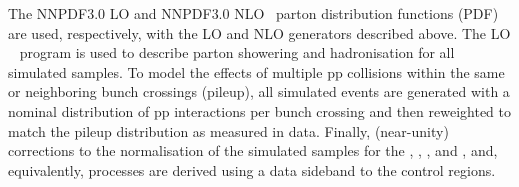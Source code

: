 
The \textsc{NNPDF}3.0 LO and \textsc{NNPDF}3.0 NLO~\cite{nnpdf} parton
distribution functions (PDF) are used, respectively, with the LO and
NLO generators described above. The LO ~\cite{pythia}
program is used to describe parton showering and hadronisation for all
simulated samples. To model the effects of multiple pp collisions
within the same or neighboring bunch crossings (pileup), all simulated
events are generated with a nominal distribution of pp interactions
per bunch crossing and then reweighted to match the pileup
distribution as measured in data. Finally, (near-unity) corrections to
the normalisation of the simulated samples for the \gj, \wmj, \ttbar,
and \zmumuj, and, equivalently, \znunuj processes are derived using a
data sideband to the control regions.
